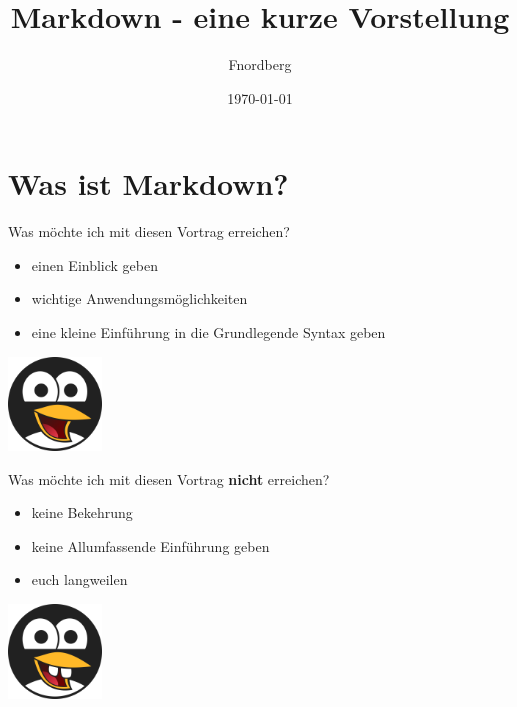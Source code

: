 \documentclass{beamer}
\title{Markdown - eine kurze Vorstellung}
\author{Fnordberg}
\date{\today}
\begin{document}
\maketitle

\section{Was ist Markdown?}
\begin{frame}{Was möchte ich mit diesen Vortrag erreichen?}
    \begin{minipage}[b]{75mm}
        \begin{itemize}
            \item einen Einblick geben
            \item wichtige Anwendungsmöglichkeiten
            \item eine kleine Einführung in die Grundlegende Syntax geben
        \end{itemize}
    \end{minipage}
        \hfill
    \begin{minipage}[b]{25mm}
        \includegraphics[width=25mm]{pic-tux_1.png}
    \end{minipage}
\end{frame}

\begin{frame}{Was möchte ich mit diesen Vortrag \textbf{nicht} erreichen?}
    \begin{minipage}[b]{75mm}
        \begin{itemize}
            \item keine Bekehrung
            \item keine Allumfassende Einführung geben
            \item euch langweilen
        \end{itemize}
    \end{minipage}
        \hfill
    \begin{minipage}[b]{25mm}
        \includegraphics[width=25mm]{pic-tux_2.png}
    \end{minipage}
\end{frame}
\end{document}
